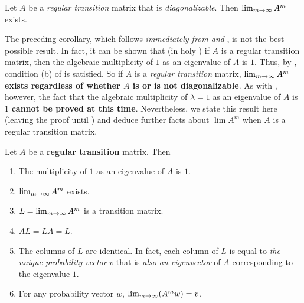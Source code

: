 \begin{corollary} \label{corollary 5.18.1}
Let \(A\) be a \emph{regular transition} matrix that is \emph{diagonalizable}.
Then \(\lim_{m \to \infty} A^m\) exists.
\end{corollary}

\begin{remark} \label{remark 5.3.7}
The preceding corollary, which follows \emph{immediately from  and }, is not the best possible result.
In fact, it can be shown that (in holy ) if \(A\) is a regular transition matrix, then the algebraic multiplicity of \(1\) as an eigenvalue of \(A\) is \(1\).
Thus, by , condition (b) of  is satisfied.
So if \(A\) is a \emph{regular transition} matrix, \textbf{\(\lim_{m \to \infty} A^m\) exists regardless of whether \(A\) is or is not diagonalizable}.
As with , however, the fact that the algebraic multiplicity of \(\lambda = 1\) as an eigenvalue of \(A\) is \(1\) \textbf{cannot be proved at this time}.
Nevertheless, we state this result here (leaving the proof until ) and deduce further facts about \(\lim A^m\) when \(A\) is a regular transition matrix.
\end{remark}

\begin{theorem} \label{thm 5.19}
Let \(A\) be a \textbf{regular transition} matrix.
Then
\begin{enumerate}
\item The multiplicity of \(1\) as an eigenvalue of \(A\) is \(1\).
\item \(\lim_{m \to \infty} A^m\) exists.
\item \(L = \lim_{m \to \infty} A^m\) is a transition matrix.
\item \(AL = LA = L\).
\item The columns of \(L\) are identical.
In fact, each column of \(L\) is equal to \emph{the unique probability vector} \(v\) that is \emph{also an eigenvector} of \(A\) corresponding to the eigenvalue \(1\).
\item For any probability vector \(w\), \(\lim_{m \to \infty} (A^m w) = v\).
\end{enumerate}
\end{theorem}

